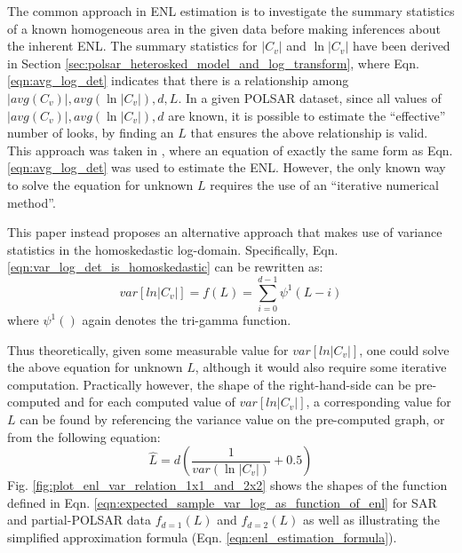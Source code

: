 \documentclass[journal,12pt,draftcls,onecolumn]{IEEEtran}
\begin{document}
The common approach in ENL estimation is to investigate the summary statistics of a known homogeneous area in the given data
  before making inferences about the inherent ENL.
The summary statistics for $|C_v|$ and $\ln|C_v|$ have been derived in Section \ref{sec:polsar_heterosked_model_and_log_transform},
  where Eqn. \ref{eqn:avg_log_det} indicates that there is a relationship among $|avg(C_v)|,avg(\ln|C_v|),d,L$.
In a given POLSAR dataset, since all values of $|avg(C_v)|,avg(\ln|C_v|),d$ are known,
  it is possible to estimate the ``effective'' number of looks, by finding an $L$ that ensures the above relationship is valid.
This approach was taken in \cite{Anfinsen_2009_TGRS_3795},
  where an equation of exactly the same form as Eqn.  \ref{eqn:avg_log_det} was used to estimate the ENL.
However, the only known way to solve the equation for unknown $L$ requires the use of an ``iterative numerical method''.

This paper instead proposes an alternative approach that makes use of variance statistics in the homoskedastic log-domain.
Specifically, Eqn. \ref{eqn:var_log_det_is_homoskedastic} can be rewritten as: 
\begin{equation}
  var \left[ ln|C_v| \right] = f(L) = \sum^{d-1}_{i=0} \psi^1(L-i)
  \label{eqn:expected_sample_var_log_as_function_of_enl}
\end{equation}
where $\psi^1()$ again denotes the tri-gamma function.

Thus theoretically, given some measurable value for $var  \left[ ln|C_v| \right]$, one could solve the above equation for unknown $L$,
  although it would also require some iterative computation.
Practically however, the shape of the right-hand-side can be pre-computed
  and for each computed value of $var  \left[ ln|C_v| \right]$, a corresponding value for $L$ can be found by referencing the variance value on the pre-computed graph, or from the following equation:%
  \begin{equation}
    \hat{L} = d \left( \frac{1}{var(\ln{|C_v|})} + 0.5 \right)
    \label{eqn:enl_estimation_formula}
  \end{equation}
Fig. \ref{fig:plot_enl_var_relation_1x1_and_2x2}
  shows the shapes of the function defined in Eqn. \ref{eqn:expected_sample_var_log_as_function_of_enl} for SAR and partial-POLSAR data $f_{d=1}(L)$ and $f_{d=2}(L)$
  as well as illustrating the simplified approximation formula (Eqn. \ref{eqn:enl_estimation_formula}).
  
\end{document}
